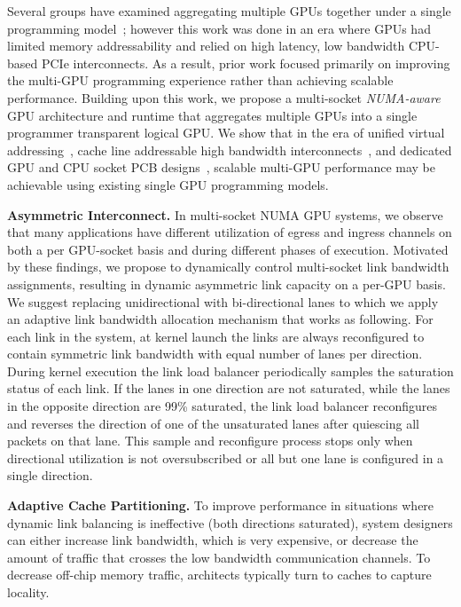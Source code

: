 \documentclass{sig-alternate}
\begin{document}
Several groups have examined aggregating multiple GPUs together under 
a single programming model~\cite{lee2013transparent,Cabezas2015}; however this 
work was done in an era where GPUs had limited memory addressability and relied 
on high latency, low bandwidth CPU-based PCIe interconnects. As a result, prior work focused primarily on improving the multi-GPU programming experience rather than achieving scalable performance. Building upon this work, we propose a 
multi-socket \textit{NUMA-aware} GPU architecture and runtime that aggregates 
multiple GPUs into a single programmer transparent logical GPU. We show that in 
the era of unified virtual addressing~\cite{UVM}, cache line addressable 
high bandwidth interconnects~\cite{NVLINK}, and dedicated GPU and CPU socket PCB 
designs~\cite{SierraHPC}, scalable multi-GPU performance may be achievable using 
existing single GPU programming models.


\textbf{Asymmetric Interconnect.} In multi-socket NUMA GPU systems, we observe that many applications have different utilization of egress and ingress channels on both a per GPU-socket basis and during different phases of execution. Motivated by these findings, we propose to dynamically control multi-socket link bandwidth assignments, resulting in dynamic asymmetric link capacity on a per-GPU basis. We suggest replacing unidirectional with bi-directional lanes to which we apply an adaptive link bandwidth allocation mechanism that works as following. For each link in the system, at kernel launch the links are always reconfigured to contain symmetric link bandwidth with equal number of lanes per direction. During kernel execution the link load balancer periodically samples the saturation status of each link. If the lanes in one direction are not saturated, while the lanes in the opposite direction are 99\% saturated, the link load balancer reconfigures and reverses the direction of one of the unsaturated lanes after quiescing all packets on that lane. This sample and reconfigure process stops only when directional utilization is not oversubscribed or all but one lane is configured in a single direction.



\textbf{Adaptive Cache Partitioning.} To improve performance in situations where dynamic link balancing is ineffective (both directions saturated), system designers can either increase link bandwidth, which is very expensive, or decrease the amount of traffic that crosses the low bandwidth communication channels. To decrease off-chip memory traffic, architects typically turn to caches
to capture locality.
\end{document}
